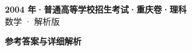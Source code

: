 \documentclass[zihao=-4, a4paper]{ctexart}
\begin{document}
\begin{center}
  {\Large\bfseries 2004 年·普通高等学校招生考试·重庆卷·理科}\\[4pt]
  {\large 数学 · 解析版}
\end{center}
\medskip
{}

\clearpage
{}
\begin{center}{\Large\bfseries 参考答案与详细解析}\end{center}
\medskip

\end{document}
